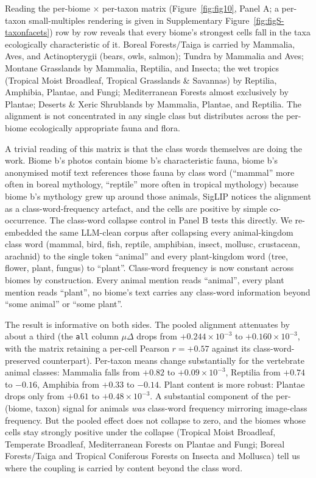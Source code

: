 \documentclass[11pt,a4paper]{article}
\begin{document}
Reading the per-biome × per-taxon matrix (Figure~\ref{fig:fig10},
Panel A; a per-taxon small-multiples rendering is given in
Supplementary Figure~\ref{fig:figS-taxonfacets}) row by row reveals
that every biome's strongest cells
fall in the taxa ecologically characteristic of it. Boreal
Forests/Taiga is carried by Mammalia, Aves, and Actinopterygii
(bears, owls, salmon); Tundra by Mammalia and Aves; Montane
Grasslands by Mammalia, Reptilia, and Insecta; the wet tropics
(Tropical Moist Broadleaf, Tropical Grasslands \& Savannas) by
Reptilia, Amphibia, Plantae, and Fungi; Mediterranean Forests
almost exclusively by Plantae; Deserts \& Xeric Shrublands by
Mammalia, Plantae, and Reptilia. The alignment is not
concentrated in any single class but distributes across the
per-biome ecologically appropriate fauna and flora.

A trivial reading of this matrix is that the class words
themselves are doing the work. Biome b's photos contain biome
b's characteristic fauna, biome b's anonymised motif text
references those fauna by class word (``mammal'' more often in
boreal mythology, ``reptile'' more often in tropical mythology)
because biome b's mythology grew up around those animals, SigLIP
notices the alignment as a class-word-frequency artefact, and the
cells are positive by simple co-occurrence. The class-word
collapse control in Panel B tests this directly. We re-embedded
the same LLM-clean corpus after collapsing every animal-kingdom
class word (mammal, bird, fish, reptile, amphibian, insect,
mollusc, crustacean, arachnid) to the single token ``animal'' and
every plant-kingdom word (tree, flower, plant, fungus) to
``plant''. Class-word frequency is now constant across biomes by
construction. Every animal mention reads ``animal'', every plant
mention reads ``plant'', no biome's text carries any class-word
information beyond ``some animal'' or ``some plant''.

The result is informative on both sides. The pooled alignment
attenuates by about a third (the \texttt{all} column $\mu\Delta$
drops from $+0.244\times 10^{-3}$ to $+0.160\times 10^{-3}$, with
the matrix retaining a per-cell Pearson $r = +0.57$ against its
class-word-preserved counterpart). Per-taxon means change
substantially for the vertebrate animal classes: Mammalia falls
from $+0.82$ to $+0.09 \times 10^{-3}$, Reptilia from $+0.74$ to
$-0.16$, Amphibia from $+0.33$ to $-0.14$. Plant content is more
robust: Plantae drops only from $+0.61$ to $+0.48 \times 10^{-3}$.
A substantial component of the per-(biome, taxon) signal for
animals \emph{was} class-word frequency mirroring image-class
frequency. But the pooled effect does not collapse to zero, and
the biomes whose cells stay strongly positive under the collapse
(Tropical Moist Broadleaf, Temperate Broadleaf, Mediterranean
Forests on Plantae and Fungi; Boreal Forests/Taiga and Tropical
Coniferous Forests on Insecta and Mollusca) tell us where the
coupling is carried by content beyond the class word.
\end{document}
